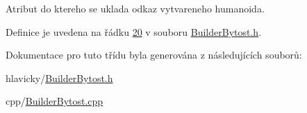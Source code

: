 Atribut do ktereho se uklada odkaz vytvareneho humanoida. 



Definice je uvedena na řádku \hyperlink{BuilderBytost_8h_source_l00020}{20} v souboru \hyperlink{BuilderBytost_8h_source}{Builder\+Bytost.\+h}.



Dokumentace pro tuto třídu byla generována z následujících souborů\+:\begin{DoxyCompactItemize}
\item 
hlavicky/\hyperlink{BuilderBytost_8h}{Builder\+Bytost.\+h}\item 
cpp/\hyperlink{BuilderBytost_8cpp}{Builder\+Bytost.\+cpp}\end{DoxyCompactItemize}
